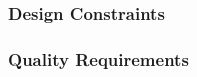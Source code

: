     \subsubsection{Design Constraints}
    \label{requirements:constraints}

    \subsubsection{Quality Requirements}
    \label{requirements:quality}

